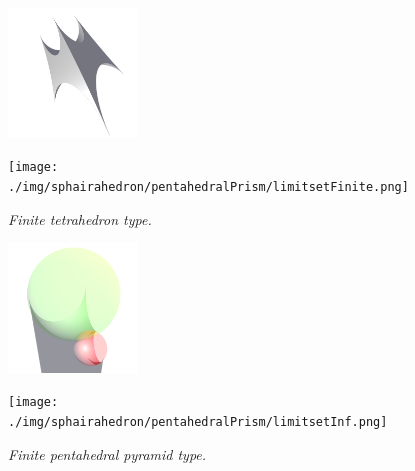 \documentclass[dvipdfmx]{interact}
\theoremstyle{plain}%
\theoremstyle{definition}
\theoremstyle{remark}
\theoremstyle{problemstyle}
\begin{document}
\begin{figure}[H]
 \begin{minipage}{0.5\textwidth}
  \begin{minipage}[t]{0.24\textwidth}
   \centering
   \includegraphics[width=1.35in, height=1.35in, keepaspectratio]{./img/sphairahedron/pentahedralPrism/sphairahedronFinite.png}
  \end{minipage}
  \hspace*{\fill}
  \begin{minipage}[t]{0.24\textwidth}
   \centering
   \texttt{[image: ./img/sphairahedron/pentahedralPrism/limitsetFinite.png]}
  \end{minipage}
  \hspace*{\fill}
  \caption{\textit{Finite tetrahedron type.}}
  \label{fig:pentahedralPrismFinite}
 \end{minipage}
 \hspace*{\fill}
 \begin{minipage}{0.5\textwidth}
  \begin{minipage}[t]{0.24\textwidth}
   \centering
   \includegraphics[width=1.35in, height=1.35in, keepaspectratio]{./img/sphairahedron/pentahedralPrism/sphairahedronInf.png}
  \end{minipage}
  \hspace*{\fill}
  \begin{minipage}[t]{0.24\textwidth}
   \centering
   \texttt{[image: ./img/sphairahedron/pentahedralPrism/limitsetInf.png]}
  \end{minipage}
  \hspace*{\fill}
  \caption{\textit{Finite pentahedral pyramid type.}}
  \label{fig:pentahedralPrismInf}
 \end{minipage}
\end{figure}
\end{document}
